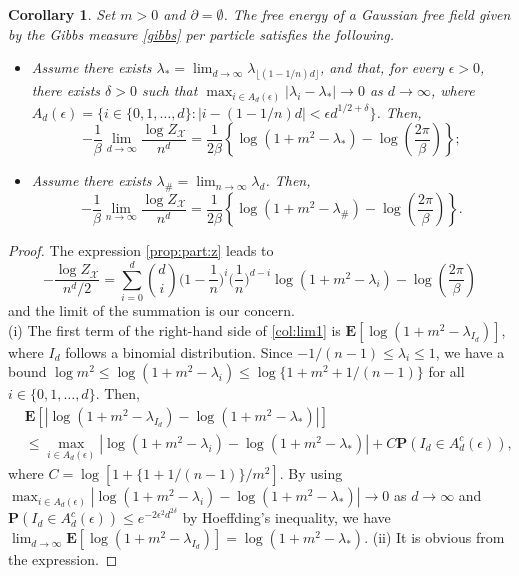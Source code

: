 \documentclass[a4paper,11pt]{article}
\theoremstyle{plain}
\newtheorem{corollary}[theorem]{Corollary}
\theoremstyle{definition}
\begin{document}
\begin{corollary}\label{cor:lim}
  Set $m>0$ and $\partial=\emptyset$. The free energy of
  a Gaussian free field given by the Gibbs measure
  \eqref{gibbs} per particle satisfies the following.
  \begin{itemize}
  \item[$(i)$]     
  Assume there exists $\lambda_*=\lim_{d\to\infty}\lambda_{\lfloor(1-1/n)d\rfloor}$, and that, for every $\epsilon>0$, there exists
  $\delta>0$ such that
  $\max_{i\in A_d(\epsilon)}|\lambda_i-\lambda_*|\to 0$ as
  $d\to\infty$, where
  $A_d(\epsilon)=\{i\in\{0,1,\ldots,d\}:|i-(1-1/n)d|<\epsilon d^{1/2+\delta}\}$.
  Then,
  \begin{equation*}
    -\frac{1}{\beta}
    \lim_{d\to\infty}\frac{\log Z_{\mathcal{X}}}{n^d}
    =\frac{1}{2\beta}\left\{\log(1+m^2-\lambda_{*})
    -\log\left(\frac{2\pi}{\beta}\right)\right\};
  \end{equation*}
  \item[$(ii)$]
  Assume there exists
  $\lambda_{\#}=\lim_{n\to\infty}\lambda_d$. Then,
  \begin{equation*}
    -\frac{1}{\beta}
    \lim_{n\to\infty}\frac{\log Z_{\mathcal{X}}}{n^d}
    =\frac{1}{2\beta}\left\{\log(1+m^2-\lambda_\#)-
    \log\left(\frac{2\pi}{\beta}\right)\right\}.
  \end{equation*}
  \end{itemize}
\end{corollary}  

\begin{proof}
  The expression \eqref{prop:part:z} leads to
  \begin{equation}\label{col:lim1}
    -\frac{\log Z_\mathcal{X}}{n^d/2}=
    \sum_{i=0}^d{d\choose i}
    \Big(1-\frac{1}{n}\Big)^i
    \Big(\frac{1}{n}\Big)^{d-i}
    \log(1+m^2-\lambda_i)-\log\left(\frac{2\pi}{\beta}\right)
  \end{equation}
  and the limit of the summation is our concern.\\
  (i) The first term of the right-hand side of
  \eqref{col:lim1} is
  $\mathbf{E}[\log(1+m^2-\lambda_{I_d})]$, where
  $I_d$ follows a binomial distribution. Since
  $-1/(n-1)\le\lambda_i\le 1$, we have a bound
  $\log m^2 \le \log(1+m^2-\lambda_i) \le \log\{1+m^2+1/(n-1)\}$
  for all $i\in\{0,1,\ldots,d\}$. Then,
  \begin{align*}
  &\mathbf{E}[|\log(1+m^2-\lambda_{I_d})-\log(1+m^2-\lambda_*)|]\\
  &\le
  \max_{i\in A_d(\epsilon)}|\log(1+m^2-\lambda_i)-\log(1+m^2-\lambda_*)|+
  C\mathbf{P}(I_d\in A^c_d(\epsilon)),
  \end{align*}
  where $C=\log[1+\{1+1/(n-1)\}/m^2]$. By using 
  $\max_{i\in A_d(\epsilon)}|\log(1+m^2-\lambda_i)-\log(1+m^2-\lambda_*)|\to 0$
  as $d\to\infty$ and
  $\mathbf{P}(I_d\in A^c_d(\epsilon))\le e^{-2\epsilon^2d^{2\delta}}$
  by Hoeffding's inequality, we have
  $\lim_{d\to\infty}\mathbf{E}[\log(1+m^2-\lambda_{I_d})]=\log(1+m^2-\lambda_*)$.
  (ii) It is obvious from the expression.
\end{proof}
  
\end{document}
